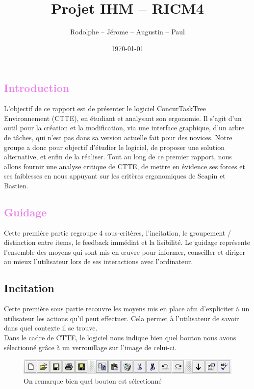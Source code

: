 \documentclass[12pt, a4paper]{article}
\title{Projet IHM -- RICM4}
\author{\bsc{Fréby} Rodolphe -- \bsc{Barbier} Jérome -- \bsc{Husson} Augustin -- \bsc{Labat} Paul}
\date{\today}
\begin{document}
\maketitle
\tableofcontents
\newpage

\textcolor{Violet}{\section{Introduction}}
L'objectif de ce rapport est de présenter le logiciel ConcurTaskTree Environnement (CTTE), en étudiant et analysant son ergonomie. Il s'agit d'un outil pour la création et la modification, via une interface graphique, d'un arbre de tâches, qui n'est pas dans sa version actuelle fait pour des novices. Notre groupe a donc pour objectif d'étudier le logiciel, de proposer une solution alternative, et enfin de la réaliser. Tout au long de ce premier rapport, nous allons fournir une analyse critique de CTTE, de mettre en évidence ses forces et ses faiblesses en nous appuyant sur les critères ergonomiques de Scapin et Bastien.  

\textcolor{Violet}{\section{Guidage}}
Cette première partie regroupe 4 sous-critères, l'incitation, le groupement / distinction entre items, le feedback immédiat et la lisibilité. Le guidage représente l'ensemble des moyens qui sont mis en œuvre pour informer, conseiller et diriger au mieux l'utilisateur lors de ses interactions avec l'ordinateur. 

\textcolor{NavyBlue}{\subsection{Incitation}}
Cette première sous partie recouvre les moyens mis en place afin d'expliciter à un utilisateur les actions qu'il peut effectuer. Cela permet à l'utilisateur de savoir dans quel contexte il se trouve.\\

Dans le cadre de CTTE, le logiciel nous indique bien quel bouton nous avons sélectionné grâce à un verrouillage sur l'image de celui-ci. 


\begin{figure}[h]
\begin{center}
   \includegraphics{incitation.jpg}
	\caption{On remarque bien quel bouton est sélectionné}
	\end{center}
\end{figure}
\end{document}
